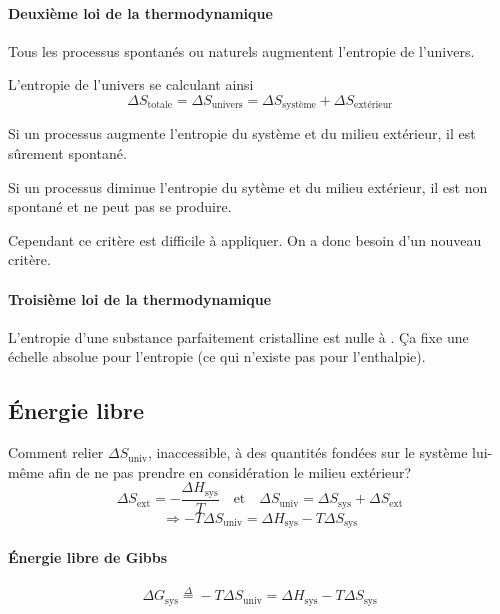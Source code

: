 \documentclass[11pt,a4paper,french]{article}
\newcommand\eqdef{\stackrel{\Delta}{=}}
\begin{document}
\paragraph{Deuxième loi de la thermodynamique}
Tous les processus spontanés ou naturels augmentent l'entropie de l'univers.

L'entropie de l'univers se calculant ainsi
\[ \Delta S_\mathrm{totale} = \Delta S_\mathrm{univers} = \Delta S_{\textrm{système}} + \Delta S_{\textrm{extérieur}} \]

Si un processus augmente l'entropie du système et du milieu extérieur, il est sûrement spontané.

Si un processus diminue l'entropie du sytème et du milieu extérieur, il est non spontané et ne peut pas se produire.


Cependant ce critère est difficile à appliquer.
On a donc besoin d'un nouveau critère.

\paragraph{Troisième loi de la thermodynamique}
L'entropie d'une substance parfaitement cristalline est nulle à .
\c{C}a fixe une échelle absolue pour l'entropie (ce qui n'existe pas pour l'enthalpie).



\subsection{\'Energie libre}
Comment relier $\Delta S_\mathrm{univ}$, inaccessible, à des quantités fondées sur le système lui-même afin de ne pas prendre en considération le milieu extérieur?
\[ \Delta S_\mathrm{ext}=-\frac{\Delta H_\mathrm{sys}}{T}
\quad\mathrm{et}\quad
\Delta S_\mathrm{univ}=\Delta S_\mathrm{sys}+\Delta S_\mathrm{ext} \]
$$\Rightarrow -T\Delta S_\mathrm{univ}=\Delta H_\mathrm{sys}-T\Delta S_\mathrm{sys}$$

\paragraph{\'Energie libre de Gibbs}
\[ \Delta G_\mathrm{sys} \eqdef -T\Delta S_\mathrm{univ} = \Delta H_\mathrm{sys} - T\Delta S_\mathrm{sys} \]
\end{document}

